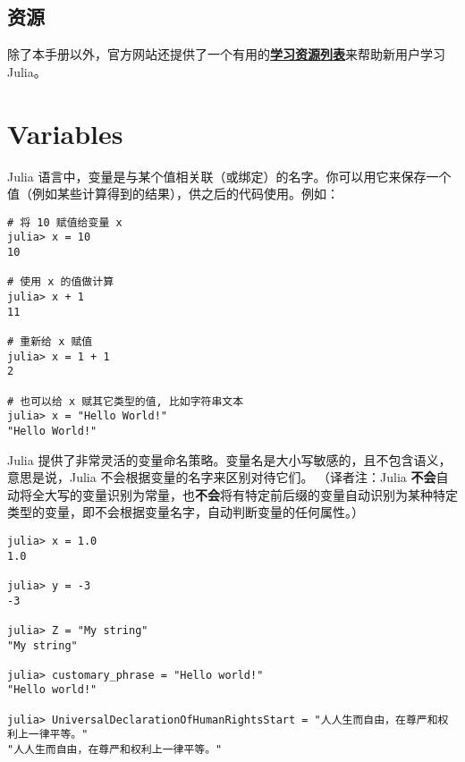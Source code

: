 \hypertarget{17073013932993739054}{}


\section{资源}



除了本手册以外，官方网站还提供了一个有用的\textbf{\href{https://julialang.org/learning/}{学习资源列表}}来帮助新用户学习 Julia。



\hypertarget{10731958648755981077}{}


\chapter{Variables}



Julia 语言中，变量是与某个值相关联（或绑定）的名字。你可以用它来保存一个值（例如某些计算得到的结果），供之后的代码使用。例如：




\begin{verbatim}
# 将 10 赋值给变量 x
julia> x = 10
10

# 使用 x 的值做计算
julia> x + 1
11

# 重新给 x 赋值
julia> x = 1 + 1
2

# 也可以给 x 赋其它类型的值, 比如字符串文本
julia> x = "Hello World!"
"Hello World!"
\end{verbatim}



Julia 提供了非常灵活的变量命名策略。变量名是大小写敏感的，且不包含语义，意思是说，Julia 不会根据变量的名字来区别对待它们。 （译者注：Julia \textbf{不会}自动将全大写的变量识别为常量，也\textbf{不会}将有特定前后缀的变量自动识别为某种特定类型的变量，即不会根据变量名字，自动判断变量的任何属性。）




\begin{verbatim}
julia> x = 1.0
1.0

julia> y = -3
-3

julia> Z = "My string"
"My string"

julia> customary_phrase = "Hello world!"
"Hello world!"

julia> UniversalDeclarationOfHumanRightsStart = "人人生而自由，在尊严和权利上一律平等。"
"人人生而自由，在尊严和权利上一律平等。"
\end{verbatim}



